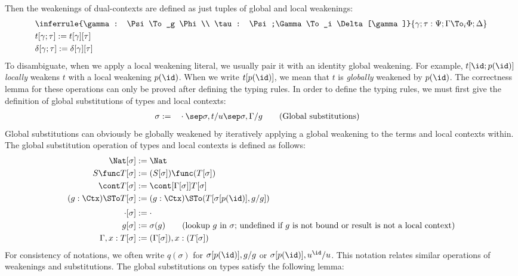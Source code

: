 Then the weakenings of dual-contexts are defined as just tuples of global and local
weakenings:
\begin{align*}
  &\inferrule
  {\gamma : \Psi \To_g \Phi \\ \tau : \Psi;\Gamma \To_i \Delta[\gamma]}
  {\gamma; \tau : \Psi; \Gamma \To_i \Phi; \Delta} \\
  &t[\gamma; \tau] := t[\gamma][\tau] \\
  &\delta[\gamma; \tau] := \delta[\gamma][\tau]
\end{align*}
To disambiguate, when we apply a local weakening literal, we usually pair it with an
identity global weakening. %
For example, $t [ \id; p(\id)]$ \emph{locally} weakens $t$ with a local weakening $p(\id)$. %
When we write $t[p(\id)]$, we mean that $t$ is \emph{globally} weakened by $p(\id)$. %
The correctness lemma for these operations can only be proved after defining the typing
rules. %
In order to define the typing rules, we must first give the definition of global
substitutions of types and local contexts:
\begin{alignat*}{2}
  \sigma &:=&& \cdot \sep \sigma, t/u \sep \sigma, \Gamma/g
               \tag{Global substitutions}
\end{alignat*}
Global substitutions can obviously be globally weakened by iteratively applying a
global weakening to the terms and local contexts within. %
The global substitution operation of types and local contexts is defined as follows:
\begin{align*}
  \Nat [\sigma] &:= \Nat \\
  S \func T [\sigma] &:= (S[\sigma]) \func (T[\sigma]) \\
  \cont T [\sigma] &:= \cont[\Gamma[\sigma]]{T[\sigma]} \\
  (g: \Ctx) \STo T [\sigma] &:= (g: \Ctx) \STo (T [\sigma[p(\id)], g/g])
  \\[0.25em]
  \cdot [\sigma] &:= \cdot \\
  g [\sigma] &:= \sigma(g)
                  \tag{lookup $g$ in $\sigma$; undefined if $g$ is not bound or result is not a
                  local context} \\
  \Gamma, x : T[\sigma] &:= (\Gamma[\sigma]) , x : (T[\sigma])
\end{align*}
For consistency of notations, we often write $q(\sigma)$ for $\sigma[p(\id)], g/g$ or
$\sigma[p(\id)], u^\id/u$. %
This notation relates similar operations of weakenings and substitutions. %
The global substitutions on types satisfy the following lemma:
